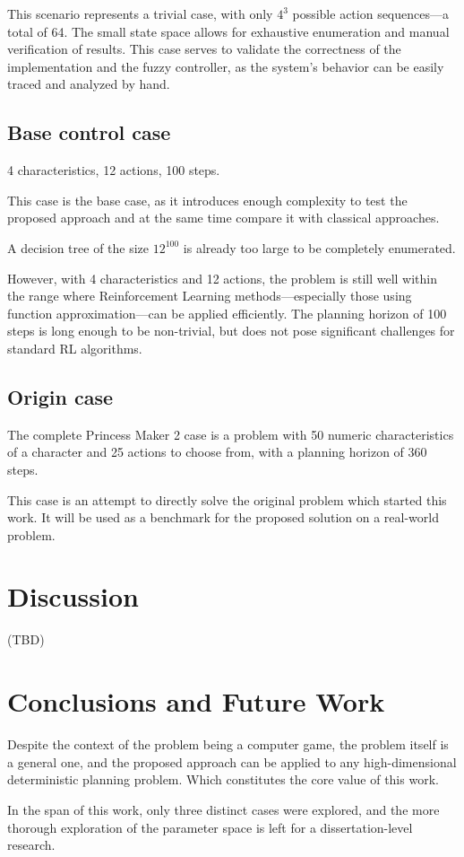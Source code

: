 \documentclass[11pt, a4paper]{article}
\begin{document}
	This scenario represents a trivial case, with only $4^{3}$ possible action sequences—a total of 64.
	The small state space allows for exhaustive enumeration and manual verification of results.
	This case serves to validate the correctness of the implementation and the fuzzy controller, as the system's behavior can be easily traced and analyzed by hand.

	\subsection{Base control case}
    
	4 characteristics, 12 actions, 100 steps.

	This case is the base case, as it introduces enough complexity to test the proposed approach and at the same time compare it with classical approaches.

	A decision tree of the size $12^{100}$ is already too large to be completely enumerated.

	However, with 4 characteristics and 12 actions, the problem is still well within the range where Reinforcement Learning methods—especially those using function approximation—can be applied efficiently.
	The planning horizon of 100 steps is long enough to be non-trivial, but does not pose significant challenges for standard RL algorithms.

	\subsection{Origin case}

	The complete Princess Maker 2 case is a problem with 50 numeric characteristics of a character and 25 actions to choose from, with a planning horizon of 360 steps.

	This case is an attempt to directly solve the original problem which started this work.
	It will be used as a benchmark for the proposed solution on a real-world problem.

	\section{Discussion}

	(TBD)
	
	\section{Conclusions and Future Work}

	Despite the context of the problem being a computer game, the problem itself is a general one, and the proposed approach can be applied to any high-dimensional deterministic planning problem.
	Which constitutes the core value of this work.

	In the span of this work, only three distinct cases were explored, and the more thorough exploration of the parameter space is left for a dissertation-level research.

	\printbibliography
\end{document}
